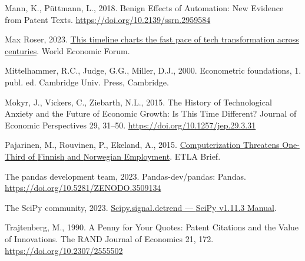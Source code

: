 \documentclass[
  11,
  a4paperpaper,
]{article}
\newlength{\cslhangindent}
\newenvironment{CSLReferences}[2] %
 {\begin{list}{}{%
  \setlength{\itemindent}{0pt}
  \setlength{\leftmargin}{0pt}
  \setlength{\parsep}{0pt}
  \ifodd #1
   \setlength{\leftmargin}{\cslhangindent}
   \setlength{\itemindent}{-1\cslhangindent}
  \fi
  \setlength{\itemsep}{#2\baselineskip}}}
 {\end{list}}
\begin{document}
\begin{CSLReferences}{1}{0}
Mann, K., Püttmann, L., 2018. Benign {Effects} of {Automation}: {New}
{Evidence} from {Patent} {Texts}.
\url{https://doi.org/10.2139/ssrn.2959584}

Max Roser, 2023.
\href{https://www.weforum.org/agenda/2023/02/this-timeline-charts-the-fast-pace-of-tech-transformation-across-centuries/}{This
timeline charts the fast pace of tech transformation across centuries}.
World Economic Forum.

Mittelhammer, R.C., Judge, G.G., Miller, D.J., 2000. Econometric
foundations, 1. publ. ed. Cambridge Univ. Press, Cambridge.

Mokyr, J., Vickers, C., Ziebarth, N.L., 2015. The {History} of
{Technological} {Anxiety} and the {Future} of {Economic} {Growth}: {Is}
{This} {Time} {Different}? Journal of Economic Perspectives 29, 31--50.
\url{https://doi.org/10.1257/jep.29.3.31}

Pajarinen, M., Rouvinen, P., Ekeland, A., 2015.
\href{https://ideas.repec.org//p/rif/briefs/34.html}{Computerization
{Threatens} {One}-{Third} of {Finnish} and {Norwegian} {Employment}}.
ETLA Brief.

The pandas development team, 2023. Pandas-dev/pandas: {Pandas}.
\url{https://doi.org/10.5281/ZENODO.3509134}

The SciPy community, 2023.
\href{https://docs.scipy.org/doc/scipy/reference/generated/scipy.signal.detrend.html}{Scipy.signal.detrend
--- {SciPy} v1.11.3 {Manual}}.

Trajtenberg, M., 1990. A {Penny} for {Your} {Quotes}: {Patent}
{Citations} and the {Value} of {Innovations}. The RAND Journal of
Economics 21, 172. \url{https://doi.org/10.2307/2555502}


\end{CSLReferences}
\end{document}
